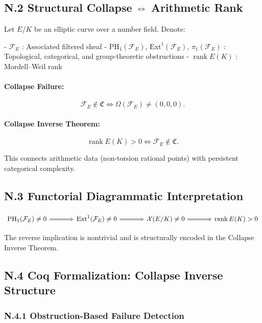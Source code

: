 \documentclass[11pt]{article}
\newcommand{\Sha}{\mathcal{X}}
\begin{document}
\subsection*{N.2 Structural Collapse ⇔ Arithmetic Rank}

Let \( E/K \) be an elliptic curve over a number field. Denote:

- \( \mathcal{F}_E \) : Associated filtered sheaf
- \( \mathrm{PH}_1(\mathcal{F}_E) \), \( \mathrm{Ext}^1(\mathcal{F}_E) \), \( \pi_1(\mathcal{F}_E) \) : Topological, categorical, and group-theoretic obstructions
- \( \operatorname{rank} E(K) \) : Mordell–Weil rank

\paragraph{Collapse Failure:}
\[
\mathcal{F}_E \notin \mathfrak{C} \iff \Omega(\mathcal{F}_E) \neq (0,0,0).
\]

\paragraph{Collapse Inverse Theorem:}
\[
\operatorname{rank} E(K) > 0 \iff \mathcal{F}_E \notin \mathfrak{C}.
\]

This connects arithmetic data (non-torsion rational points) with persistent categorical complexity.

\subsection*{N.3 Functorial Diagrammatic Interpretation}

\[
\begin{tikzcd}[row sep=large, column sep=large]
\mathrm{PH}_1(\mathcal{F}_E) \neq 0
\arrow[r, Rightarrow] &
\mathrm{Ext}^1(\mathcal{F}_E) \neq 0
\arrow[r, Rightarrow] &
\Sha(E/K) \neq 0
\arrow[r, Rightarrow] &
\operatorname{rank} E(K) > 0
\end{tikzcd}
\]

The reverse implication is nontrivial and is structurally encoded in the Collapse Inverse Theorem.

\subsection*{N.4 Coq Formalization: Collapse Inverse Structure}

\subsubsection*{N.4.1 Obstruction-Based Failure Detection}
\end{document}
